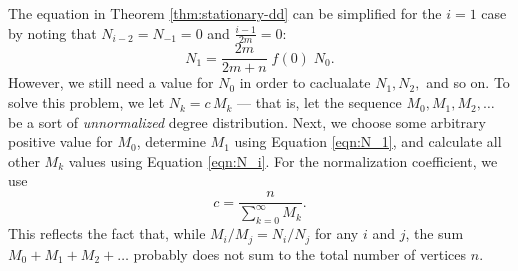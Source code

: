 \documentclass[a4paper,10pt]{article}
\begin{document}
The equation in Theorem \ref{thm:stationary-dd} can be simplified for the $i = 1$ case by noting that $N_{i - 2} = N_{-1} = 0$ and $\frac{i - 1}{2m} = 0$:
\begin{equation}
\label{eqn:N_1}
 N_{1} = \frac{2m}{2m + n} \; f(0) \; N_0.
\end{equation}
However, we still need a value for $N_0$ in order to caclualate $N_1, N_2,$ and so on. To solve this problem, we let $N_k = c \, M_k$ --- that is, let the sequence $M_0, M_1, M_2, \ldots$ be a sort of \emph{unnormalized} degree distribution. Next, we choose some arbitrary positive value for $M_0$, determine $M_1$ using Equation \ref{eqn:N_1}, and calculate all other $M_k$ values using Equation \ref{eqn:N_i}. For the normalization coefficient, we use
\begin{equation}
 c = \frac{n}{\sum\limits_{k=0}^{\infty} M_k}.
\end{equation}
This reflects the fact that, while $M_i / M_j = N_i / N_j$ for any $i$ and $j$, the sum $M_0 + M_1 + M_2 + \ldots$ probably does not sum to the total number of vertices $n$.
\end{document}
